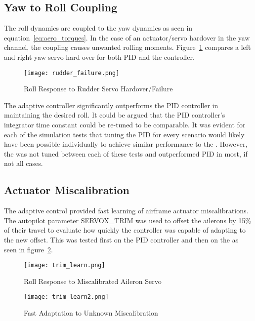 \subsection{Yaw to Roll Coupling}
The roll dynamics are coupled to the yaw dynamics as seen in equation~\ref{eq:aero_torques}.  In the case of an actuator/servo hardover in the yaw channel, the coupling causes unwanted rolling moments.  Figure~\ref{fig:rudder_failure} compares a left and right yaw servo hard over for both \ac{PID} and the \Lone controller.
\begin{figure}[h!]
 \centering
  \texttt{[image: rudder\_failure.png]}
  \caption{Roll Response to Rudder Servo Hardover/Failure}
  \label{fig:rudder_failure}
\end{figure}
The adaptive controller significantly outperforms the \ac{PID} controller in maintaining the desired roll.  It could be argued that the \ac{PID} controller's integrator time constant could be re-tuned to be comparable.  It was evident for each of the simulation tests that tuning the \ac{PID} for every scenario would likely have been possible individually to achieve similar performance to the \Lone.  However, the \Lone was not tuned between each of these tests and outperformed \ac{PID} in most, if not all cases.

\subsection{Actuator Miscalibration}
The \Lone adaptive control provided fast learning of airframe actuator miscalibrations.  The autopilot parameter SERVOX\_TRIM was used to offset the ailerons by 15\% of their travel to evaluate how quickly the controller was capable of adapting to the new offset.  This was tested first on the \ac{PID} controller and then on the \Lone as seen in figure~\ref{fig:trim_learn}.
\begin{figure}[h!]
 \centering
  \texttt{[image: trim\_learn.png]}
  \caption{Roll Response to Miscalibrated Aileron Servo}
  \label{fig:trim_learn}
\end{figure}
\begin{figure}[h!]
 \centering
  \texttt{[image: trim\_learn2.png]}
  \caption{\Lone Fast Adaptation to Unknown Miscalibration}
  \label{fig:trim_learn2}
\end{figure}

